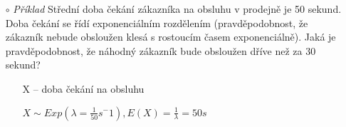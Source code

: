 \begin{itemize}
\begin{itemize}
\begin{figure}[H]
                    \end{figure}
              \item[$\circ$] \textit{Příklad} Střední doba čekání zákazníka na obsluhu v prodejně je 50 sekund. Doba čekání se řídí exponenciálním rozdělením (pravděpodobnost, že zákazník nebude obsloužen klesá s rostoucím časem exponenciálně). Jaká je pravděpodobnost, že náhodný zákazník bude obsloužen dříve než za 30 sekund?
                    \begin{itemize}
                        \item[] X -- doba čekání na obsluhu
                        \item[] $X \sim Exp (\lambda = \frac{1}{50}s^-1), E(X) = \frac{1}{\lambda} = 50 s$
                    \end{itemize}
          \end{itemize}
\end{itemize}


